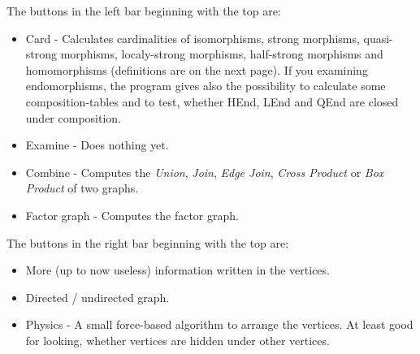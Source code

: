 \documentclass[a4paper]{article}
\begin{document}
The buttons in the left bar beginning with the top are:
\begin{itemize}
\item Card - Calculates cardinalities of isomorphisms, strong
  morphisms, quasi-strong morphisms, localy-strong morphisms,
  half-strong morphisms and homomorphisms (definitions are on the next
  page). If you examining endomorphisms, the program gives also the
  possibility to calculate some composition-tables and to test,
  whether HEnd, LEnd and QEnd are closed under composition.
\item Examine - Does nothing yet.
\item Combine - Computes the {\em Union}, {\em Join}, {\em Edge Join},
  {\em Cross Product} or {\em Box Product} of two graphs.
\item Factor graph - Computes the factor graph.
\end{itemize}
The buttons in the right bar beginning with the top are:
\begin{itemize}
\item More (up to now useless) information written in the vertices.
\item Directed / undirected graph.
\item Physics - A small force-based algorithm to arrange the vertices.
  At least good for looking, whether vertices are hidden under other vertices.
\end{itemize}
\end{document}

